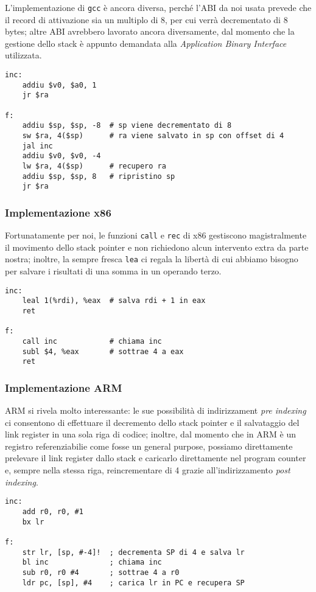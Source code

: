 \documentclass[class=book, crop=false, oneside]{standalone}
\begin{document}
L'implementazione di \texttt{gcc} è ancora diversa, perché l'ABI da noi usata prevede che il record di attivazione sia un multiplo di 8, per cui  verrà decrementato di 8 bytes; altre ABI avrebbero lavorato ancora diversamente, dal momento che la gestione dello stack è appunto demandata alla \emph{Application Binary Interface} utilizzata.
\begin{verbatim}
inc:
	addiu $v0, $a0, 1
	jr $ra

f:
	addiu $sp, $sp, -8  # sp viene decrementato di 8
	sw $ra, 4($sp)      # ra viene salvato in sp con offset di 4
	jal inc
	addiu $v0, $v0, -4
	lw $ra, 4($sp)      # recupero ra
	addiu $sp, $sp, 8   # ripristino sp
	jr $ra
\end{verbatim}

\subsubsection{Implementazione x86}
Fortunatamente per noi, le funzioni \texttt{call} e \texttt{rec} di x86 gestiscono magistralmente il movimento dello stack pointer e non richiedono alcun intervento extra da parte nostra; inoltre, la sempre fresca \texttt{lea} ci regala la libertà di cui abbiamo bisogno per salvare i risultati di una somma in un operando terzo.
\begin{verbatim}
inc:
	leal 1(%rdi), %eax  # salva rdi + 1 in eax
	ret

f:
	call inc            # chiama inc
	subl $4, %eax       # sottrae 4 a eax
	ret
\end{verbatim}

\subsubsection{Implementazione ARM}
ARM si rivela molto interessante: le sue possibilità di indirizzament \emph{pre indexing} ci consentono di effettuare il decremento dello stack pointer e il salvataggio del link register in una sola riga di codice; inoltre, dal momento che in ARM  è un registro referenziabilie come fosse un general purpose, possiamo direttamente prelevare il link register dallo stack e caricarlo direttamente nel program counter e, sempre nella stessa riga, reincrementare  di 4 grazie all'indirizzamento \emph{post indexing}.
\begin{verbatim}
inc:
	add r0, r0, #1
	bx lr

f:
	str lr, [sp, #-4]!  ; decrementa SP di 4 e salva lr
	bl inc              ; chiama inc
	sub r0, r0 #4       ; sottrae 4 a r0
	ldr pc, [sp], #4    ; carica lr in PC e recupera SP
\end{verbatim}
\end{document}
